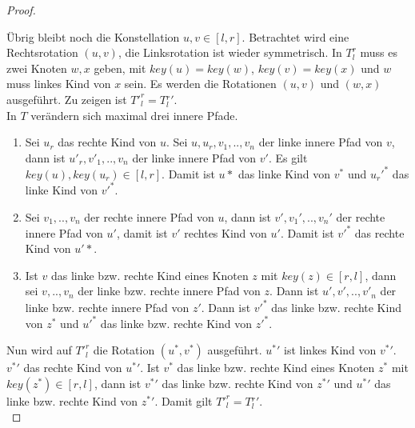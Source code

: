 \documentclass[a4paper,12pt]{article}
\begin{document}
\begin{proof}
\begin{enumerate}
\end{enumerate}	
\noindent Übrig bleibt noch die Konstellation $u,v \in \left[l,r\right]$. 
Betrachtet wird eine Rechtsrotation $(u,v)$, die Linksrotation ist wieder symmetrisch. 
In $T^r_l$ muss es zwei Knoten $w, x$ geben, mit {$\mathit{key}(u) = \mathit{key}(w)$,  $\mathit{key}(v) = \mathit{key}(x)$} und $w$ muss linkes Kind von $x$ sein.
Es werden die Rotationen $\left(u,v \right)$ und $\left(w,x \right)$ ausgeführt.
Zu zeigen ist ${T'}^r_l = T{^r_l}' $.\\
In $T$ verändern sich maximal drei innere Pfade.
\begin{enumerate}
	\item Sei $u_r$ das rechte Kind von $u$. Sei $u,u_r,v_1,..,v_n$ der linke innere Pfad von $v$, dann ist $u'_r,v'_1,..,v_n$ der linke innere Pfad von $v'$. Es gilt ${\mathit{key}(u), \mathit{key}(u_r) \in \left[l,r\right] }$. Damit ist $u*$ das linke Kind von $v^*$ und ${u_r}'^*$ das linke Kind von $v'^*$.
	\item Sei $v_1,..,v_n$ der rechte innere Pfad von $u$, dann ist $v',v_1',..,v_n'$ der rechte innere Pfad von $u'$, damit ist $v'$ rechtes Kind von $u'$. Damit ist $v'^*$ das rechte Kind von $u'*$.
	\item Ist $v$ das linke bzw. rechte Kind eines Knoten $z$ mit $\mathit{key}(z) \in \left[r,l\right]$, dann sei  $v,..,v_n$ der linke bzw. rechte innere Pfad von $z$. Dann ist  $u',v',..,v'_n$ der linke bzw. rechte innere Pfad von $z'$. Dann ist  $v'^*$ das linke bzw. rechte Kind von $z^*$ und $u'^*$ das linke bzw. rechte Kind von $z'^*$.
\end{enumerate}
 \noindent Nun wird auf ${T'}^r_l$ die Rotation $(u^*,v^*)$ ausgeführt. $u{^*}'$ ist linkes Kind von $v{^*}'$. $v{^*}'$ das rechte Kind von $u{^*}'$. Ist $v^*$ das linke bzw. rechte Kind eines Knoten $z^*$ mit  $\mathit{key}(z^*) \in \left[r,l\right]$, dann ist $v{^*}'$ das linke bzw. rechte Kind von $z{^*}'$ und $u{^*}'$ das linke bzw. rechte Kind von $z{^*}'$. Damit gilt ${T'}^r_l = T{^r_l}'$.\\
 	
\end{proof}
    
\end{document}
